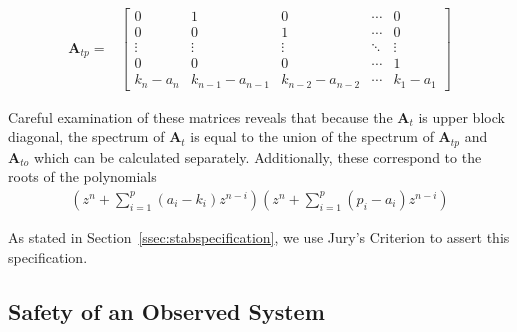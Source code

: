 \documentclass[twocolumn]{autart}    %
\newcommand{\mat}[1]{\boldsymbol{#1}}
\begin{document}
\begin{align*}
\mat{A}_{tp}=&\left[
\begin{array}{ccccc}
0&1&0&\cdots&0\\
0&0&1&\cdots&0\\
\vdots&\vdots&\vdots&\ddots&\vdots\\
0&0&0&\cdots&1\\
k_n-a_n&k_{n-1}-a_{n-1}&k_{n-2}-a_{n-2}&\cdots&k_1-a_1
\end{array}\right]
\label{eq:cf_SISO_2}
\end{align*}

Careful examination of these matrices reveals that because the $\mat{A}_t$ is upper block diagonal, the spectrum of $\mat{A}_t$ is equal to the union of the spectrum of $\mat{A}_{tp}$ and $\mat{A}_{to}$ which can be calculated separately. Additionally, these correspond to the roots of the polynomials
\begin{align*}
\left(z^n+\sum_{i=1}^p{(a_i-k_i)z^{n-i}}\right) \left(z^n+\sum_{i=1}^p{(p_i-a_i)z^{n-i}}\right)
\end{align*}

As stated in Section~\ref{ssec:stabspecification}, we use Jury's Criterion
to assert this specification.

\subsection{Safety of an Observed System}\label{sec:cof_safety}
\end{document}
